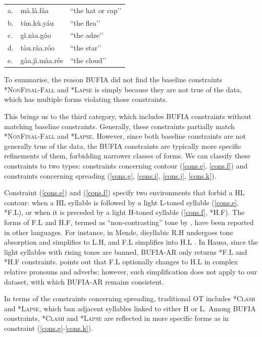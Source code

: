 \documentclass{CUP-JNL-PHO}%
\theoremstyle{definition}
\numberwithin{equation}{section}
\theoremstyle{definition}
\begin{document}
\begin{tabular}{@{}l@{\hspace{0.8em}}l@{\hspace{1em}}l@{}}
	a.  & mà.là.fáa      & ``the hat or cap’’ \\
	b.  & tùn.kù.yáu     & ``the flea’’ \\
	c.  & gì.zàa.góo     & ``the adze’’ \\
	d.  & tàu.ràa.róo    & ``the star’’ \\
	e.  & gàa.jì.màa.rée & ``the cloud’’ \\
\end{tabular}
\z

To summarise, the reason BUFIA did not find the baseline constraints
\textsc{*NonFinal-Fall} and \textsc{*Lapse} is simply because they are
not true of the data, which has multiple forms violating those
constraints.

This brings us to the third category, which includes BUFIA constraints
without matching baseline constraints. Generally, these constraints
partially match \textsc{*NonFinal-Fall} and \textsc{*Lapse}. However,
since both baseline constraints are not generally true of the data,
the BUFIA constraints are typically more specific refinements of them,
forbidding narrower classes of forms. We can classify these constraints
to two types: constraints concerning contour (\ref{cons.e}, \ref{cons.f})
and constraints concerning spreading (\ref{cons.g}, \ref{cons.i},
\ref{cons.j}, \ref{cons.k}).

Constraint (\ref{cons.e}) and (\ref{cons.f}) specify two environments that forbid 
a HL contour: when a HL syllable is followed by a light L-toned syllable 
(\ref{cons.e}, *F.L), or when it is preceded by a light H-toned syllable 
(\ref{cons.f}, *H.F). The forms of F.L and H.F, termed as ``non-contrasting'' 
tone by \citet{zoll2003optimal}, have been reported in other languages. 
For instance, in Mende, disyllabic R.H undergoes tone absorption and
simplifies to L.H, and F.L simplifies into H.L \citep{leben2017tone}. 
In Hausa, since the light syllables with rising tones are banned, BUFIA-AR 
only returns *F.L and *H.F constraints. \citet[p.598]{Newmanbook} 
points out that F.L optionally changes to H.L in complex relative pronouns 
and adverbs; however, such simplification does not apply to our dataset, 
with which BUFIA-AR remains consistent.

In terms of the constraints concerning spreading, traditional OT includes 
\textsc{*Clash} and \textsc{*Lapse}, which ban adjacent syllables linked 
to either H or L. Among BUFIA constraints, \textsc{*Clash } and \textsc{*Lapse} 
are reflected in more specific forms as in constraint (\ref{cons.g}-\ref{cons.k}).
\end{document}
